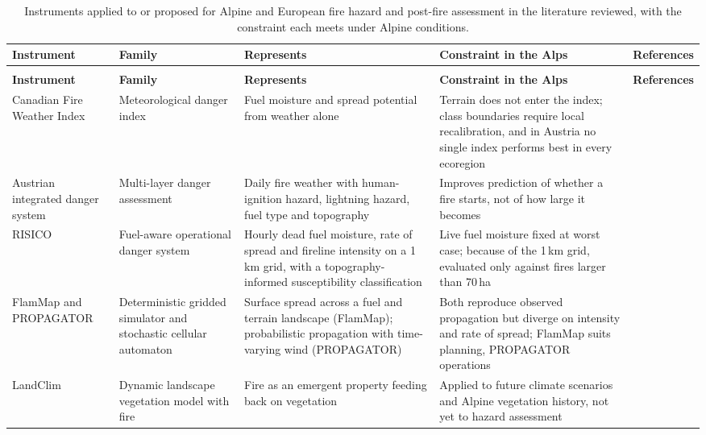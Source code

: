 \documentclass[11pt,a4paper]{article}
\begin{document}
{\footnotesize
\setlength{\tabcolsep}{4pt}
\renewcommand{\arraystretch}{1.05}
\begin{xltabular}{\textwidth}{@{}>{\raggedright\arraybackslash}p{2.35cm} >{\raggedright\arraybackslash}p{2.1cm} >{\raggedright\arraybackslash}X >{\raggedright\arraybackslash}X >{\raggedright\arraybackslash}p{2.5cm}@{}}
\caption{Instruments applied to or proposed for Alpine and European fire hazard and post-fire assessment in the literature reviewed, with the constraint each meets under Alpine conditions.}\label{tab:models}\\
\toprule
\textbf{Instrument} & \textbf{Family} & \textbf{Represents} & \textbf{Constraint in the Alps} & \textbf{References} \\
\midrule
\endfirsthead
{}\\
\toprule
\textbf{Instrument} & \textbf{Family} & \textbf{Represents} & \textbf{Constraint in the Alps} & \textbf{References} \\
\midrule
\endhead
\bottomrule
\endlastfoot
Canadian Fire Weather Index & Meteorological danger index & Fuel moisture and spread potential from weather alone & Terrain does not enter the index; class boundaries require local recalibration, and in Austria no single index performs best in every ecoregion & \citealp{zacharakis_environmental_2023, arpaci_selecting_2013} \\
Austrian integrated danger system & Multi-layer danger assessment & Daily fire weather with human-ignition hazard, lightning hazard, fuel type and topography & Improves prediction of whether a fire starts, not of how large it becomes & \citealp{muller_towards_2020} \\
RISICO & Fuel-aware operational danger system & Hourly dead fuel moisture, rate of spread and fireline intensity on a 1\,km grid, with a topography-informed susceptibility classification & Live fuel moisture fixed at worst case; because of the 1\,km grid, evaluated only against fires larger than 70\,ha & \citealp{perello_fuelaware_2025} \\
FlamMap and PROPAGATOR & Deterministic gridded simulator and stochastic cellular automaton & Surface spread across a fuel and terrain landscape (FlamMap); probabilistic propagation with time-varying wind (PROPAGATOR) & Both reproduce observed propagation but diverge on intensity and rate of spread; FlamMap suits planning, PROPAGATOR operations & \citealp{malanchini_modeling_2025} \\
LandClim & Dynamic landscape vegetation model with fire & Fire as an emergent property feeding back on vegetation & Applied to future climate scenarios and Alpine vegetation history, not yet to hazard assessment & \citealp{schumacher_relative_2006, colombaroli_species_2010} \\

\end{xltabular}}
\end{document}
